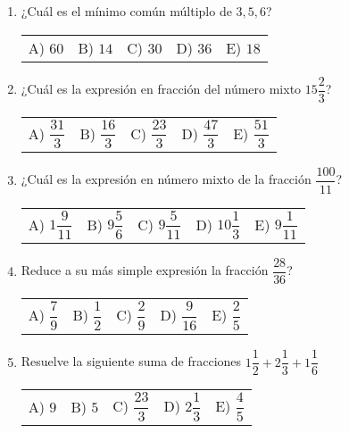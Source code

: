 \begin{enumerate}
\item ¿Cuál es el mínimo común múltiplo de $3, 5, 6$?
\begin{table}[H]
\large
\begin{tabular}{p{2cm} p{2cm} p{2cm} p{2cm} p{2cm}}
A) $60$ & B) $14$ & C) $30$ & D) $36$ & E) $18$ \\
\end{tabular}
\end{table}
\item ¿Cuál es la expresión en fracción del número mixto $15 \dfrac{2}{3}$?
\begin{table}[H]
    \large
\begin{tabular}{p{2cm} p{2cm} p{2cm} p{2cm} p{2cm}}
A) $\dfrac{31}{3}$ & B) $\dfrac{16}{3}$ & C) $\dfrac{23}{3}$ & D) $\dfrac{47}{3}$ & E) $\dfrac{51}{3}$ \\
\end{tabular}
\end{table}
\item ¿Cuál es la expresión en número mixto de la fracción $\dfrac{100}{11}$?
\begin{table}[H]
    \large
\begin{tabular}{p{2cm} p{2cm} p{2cm} p{2cm} p{2cm}}
A) $1 \dfrac{9}{11}$ & B) $9 \dfrac{5}{6}$ & C) $9 \dfrac{5}{11}$ & D) $10 \dfrac{1}{3}$ & E) $9 \dfrac{1}{11}$ \\
\end{tabular}
\end{table}
\item Reduce a su más simple expresión la fracción $\dfrac{28}{36}$?
\begin{table}[H]
    \large
\begin{tabular}{p{2cm} p{2cm} p{2cm} p{2cm} p{2cm}}
A) $\dfrac{7}{9}$ & B) $\dfrac{1}{2}$ & C) $\dfrac{2}{9}$ & D) $\dfrac{9}{16}$ & E) $\dfrac{2}{5}$ \\
\end{tabular}
\end{table}
\item Resuelve la siguiente suma de fracciones $1 \dfrac{1}{2} + 2 \dfrac{1}{3} + 1 \dfrac{1}{6}$
\begin{table}[H]
    \large
\begin{tabular}{p{2cm} p{2cm} p{2cm} p{2cm} p{2cm}}
A) $9$ & B) $5$ & C) $\dfrac{23}{3}$ & D) $2 \dfrac{1}{3}$ & E) $\dfrac{4}{5}$ \\
\end{tabular}
\end{table}
\end{enumerate}

